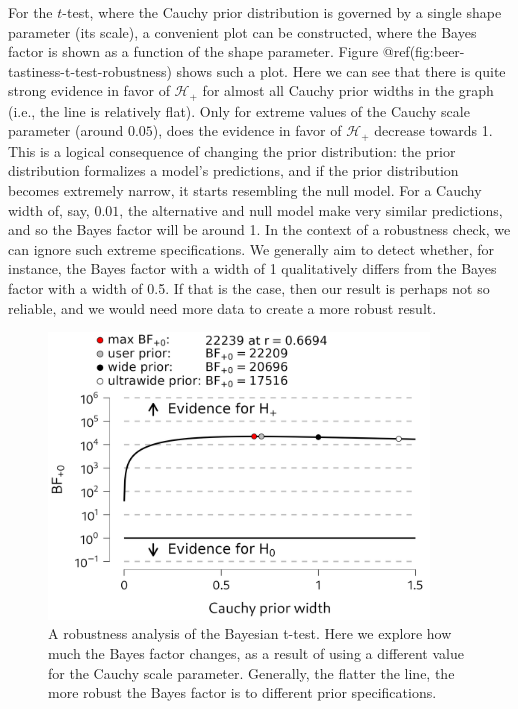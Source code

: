 \documentclass[
  letterpaper,
  DIV=11,
  numbers=noendperiod]{scrreprt}
\begin{document}
For the \(t\)-test, where the Cauchy prior distribution is governed by a
single shape parameter (its scale), a convenient plot can be
constructed, where the Bayes factor is shown as a function of the shape
parameter. Figure @ref(fig:beer-tastiness-t-test-robustness) shows such
a plot. Here we can see that there is quite strong evidence in favor of
\(\mathcal{H}_{+}\) for almost all Cauchy prior widths in the graph
(i.e., the line is relatively flat). Only for extreme values of the
Cauchy scale parameter (around \(0.05\)), does the evidence in favor of
\(\mathcal{H}_{+}\) decrease towards 1. This is a logical consequence of
changing the prior distribution: the prior distribution formalizes a
model's predictions, and if the prior distribution becomes extremely
narrow, it starts resembling the null model. For a Cauchy width of, say,
\(0.01\), the alternative and null model make very similar predictions,
and so the Bayes factor will be around 1. In the context of a robustness
check, we can ignore such extreme specifications. We generally aim to
detect whether, for instance, the Bayes factor with a width of 1
qualitatively differs from the Bayes factor with a width of 0.5. If that
is the case, then our result is perhaps not so reliable, and we would
need more data to create a more robust result.

\begin{figure}

{\centering \includegraphics[width=0.9\textwidth,height=\textheight]{Figures/TTestBeerTastinessRobustness.png}

}

\caption{A robustness analysis of the Bayesian t-test. Here we explore
how much the Bayes factor changes, as a result of using a different
value for the Cauchy scale parameter. Generally, the flatter the line,
the more robust the Bayes factor is to different prior specifications.}

\end{figure}
\end{document}
